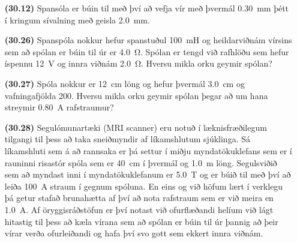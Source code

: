 \begin{enumerate}[label = \textbf{(\alph*)}]

\item[\textbf{(30.12)}] Spansóla er búin til með því að vefja vír með þvermál \SI{0.30}{mm} þétt í kringum sívalning með geisla \SI{2.0}{mm}. 

\item[\textbf{(30.26)}] Spanspóla nokkur hefur spanstuðul \SI{100}{mH} og heildarviðnám vírsins sem að spólan er búin til úr er \SI{4.0}{\ohm}. Spólan er tengd við rafhlöðu sem hefur íspennu \SI{12}{V} og innra viðnám \SI{2.0}{\ohm}. Hversu mikla orku geymir spólan?

\item[\textbf{(30.27)}] Spóla nokkur er \SI{12}{cm} löng og hefur þvermál \SI{3.0}{cm} og vafningafjölda \SI{200}{}. Hversu mikla orku geymir spólan þegar að um hana streymir \SI{0.80}{A} rafstraumur?

\item[\textbf{(30.28)}] Segulómunartæki (MRI scanner) eru notuð í læknisfræðilegum tilgangi til þess að taka sneiðmyndir af líkamshlutum sjúklinga. Sá líkamshluti sem á að rannsaka er þá settur í miðju myndatökuklefans sem er í rauninni risastór spóla sem er \SI{40}{cm} í þvermál og \SI{1.0}{m} löng. Segulsviðið sem að myndast inni í myndatökuklefanum er \SI{5.0}{T} og er búið til með því að leiða \SI{100}{A} straum í gegnum spóluna. En eins og við höfum lært í verklegu þá getur stafað brunahætta af því að nota rafstraum sem er við meira en \SI{1.0}{A}. Af öryggisráðstöfun er því notast við ofurflæðandi helíum við lágt hitastig til þess að kæla vírana sem að spólan er búin til úr þannig að þeir vírar verða ofurleiðandi og hafa því svo gott sem ekkert innra viðnám.



\end{enumerate}
